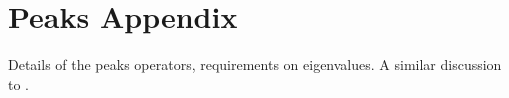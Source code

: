 \chapter{Peaks Appendix}
\label{PeaksAppendix}
\graphicspath{{Figures/PeaksAppendix/}}

Details of the peaks operators, requirements on eigenvalues. A similar discussion to \citep{Leonhardt:2003}.